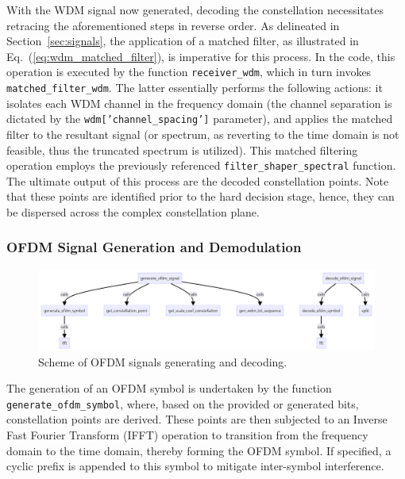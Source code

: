 With the WDM signal now generated, decoding the constellation necessitates retracing the aforementioned steps in reverse order. As delineated in Section~\ref{sec:signals}, the application of a matched filter, as illustrated in Eq.~(\ref{eq:wdm_matched_filter}), is imperative for this process. In the code, this operation is executed by the function \texttt{receiver\_wdm}, which in turn invokes \texttt{matched\_filter\_wdm}. The latter essentially performs the following actions: it isolates each WDM channel in the frequency domain (the channel separation is dictated by the \texttt{wdm['channel\_spacing']} parameter), and applies the matched filter to the resultant signal (or spectrum, as reverting to the time domain is not feasible, thus the truncated spectrum is utilized). This matched filtering operation employs the previously referenced \texttt{filter\_shaper\_spectral} function. The ultimate output of this process are the decoded constellation points. Note that these points are identified prior to the hard decision stage, hence, they can be dispersed across the complex constellation plane.



\subsubsection{OFDM Signal Generation and Demodulation}

\begin{figure}[thpb]
   \centering
    \includegraphics[width=1\linewidth]{images/hpcom/odfm_creation.png}
    \caption{Scheme of OFDM signals generating and decoding.}
    \label{fig:ofdm_code_scheme}
\end{figure}

The generation of an OFDM symbol is undertaken by the function \texttt{generate\_ofdm\_symbol}, where, based on the provided or generated bits, constellation points are derived. These points are then subjected to an Inverse Fast Fourier Transform (IFFT) operation to transition from the frequency domain to the time domain, thereby forming the OFDM symbol. If specified, a cyclic prefix is appended to this symbol to mitigate inter-symbol interference. 

